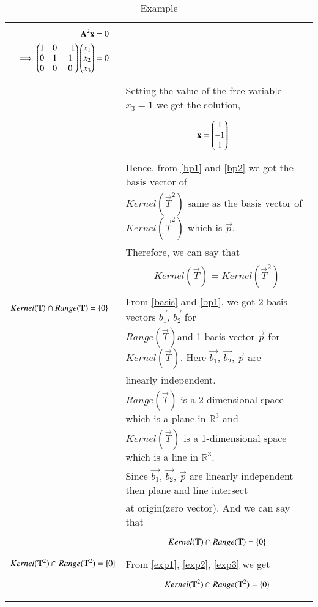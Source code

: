 \documentclass[journal,12pt]{IEEEtran}
\begin{document}
\begin{longtable}{|l|l|}
{\begin{align}
\mathbf{A}^2\mathbf{x} &= 0\\
\implies\begin{pmatrix}1&0&-1\\0&1&1\\0&0&0\end{pmatrix}\begin{pmatrix}x_1\\x_2\\x_3\end{pmatrix} &= 0
\end{align}}\\&Setting the value of the free variable $x_3 = 1$ we get the solution,\\&\parbox{12cm}{
\begin{align}
\mathbf{x} &= \begin{pmatrix}1\\-1\\1\end{pmatrix}\label{bp2}
\end{align}}\\&Hence, from \eqref{bp1} and \eqref{bp2} we got the basis vector of\\&$Kernel(\vec{T}^2)$ same as the basis vector of $Kernel(\vec{T}^2)$ which is $\vec{p}$.\\&Therefore, we can say that\\&\parbox{12cm}{\begin{align}
    Kernel(\vec{T})=Kernel(\vec{T}^2)\label{exp2}
\end{align}}\\
\hline
$Kernel(\mathbf{T})\cap Range(\mathbf{T})=\left\{0\right\}$&From \eqref{basis} and \eqref{bp1}, we got 2 basis vectors $\vec{b_1}$, $\vec{b_2}$ for \\&$Range(\vec{T})$and 1 basis vector $\vec{p}$ for $Kernel(\vec{T})$. Here $\vec{b_1}$, $\vec{b_2}$, $\vec{p}$ are\\&linearly independent.\\&$Range(\vec{T})$ is a 2-dimensional space which is a plane in $\mathbb{R}^3$ and\\&$Kernel(\vec{T})$ is a 1-dimensional space which is a line in $\mathbb{R}^3$.\\&Since $\vec{b_1}$, $\vec{b_2}$, $\vec{p}$ are linearly independent then plane and line intersect\\&at origin(zero vector). And we can say that\\&\parbox{12cm}{\begin{align}
    Kernel(\mathbf{T})\cap Range(\mathbf{T})=\left\{0\right\}\label{exp3}
\end{align}}\\
\hline
$Kernel(\mathbf{T}^2)\cap Range(\mathbf{T}^2)=\left\{0\right\}$&From \eqref{exp1}, \eqref{exp2}, \eqref{exp3} we get\\&\parbox{12cm}{\begin{align}
    Kernel(\mathbf{T}^2)\cap Range(\mathbf{T}^2)=\left\{0\right\}
\end{align}}\\
\hline
\caption{Example}
\label{exp}
\end{longtable}
\end{document}
